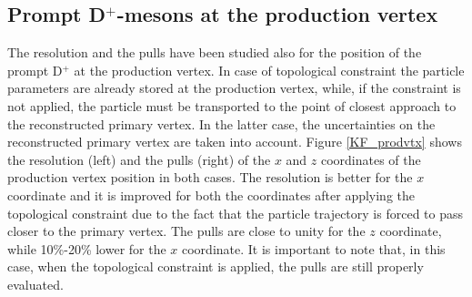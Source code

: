 \documentclass[b5paper,10pt,twoside,oldstyle,classica]{toptesi}
\begin{document}
\subsection{Prompt D$^+$-mesons at the production vertex}
The resolution and the pulls have been studied also for the position of the prompt D$^+$ at the production vertex. In case of topological constraint the particle parameters are already stored at the production vertex, while, if the constraint is not applied, the particle must be transported to the point of closest approach to the reconstructed primary vertex. In the latter case, the uncertainties on the reconstructed primary vertex are taken into account. Figure \ref{KF_prodvtx} shows the resolution (left) and the pulls (right) of the $x$ and $z$ coordinates of the production vertex position in both cases. The resolution is better for the $x$ coordinate and it is improved for both the coordinates after applying the topological constraint due to the fact that the particle trajectory is forced to pass closer to the primary vertex. The pulls are close to unity for the $z$ coordinate, while 10\%-20\% lower for the $x$ coordinate. It is important to note that, in this case, when the topological constraint is applied, the pulls are still properly evaluated.
\end{document}
